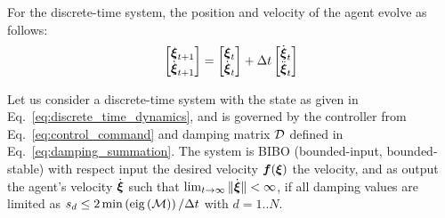 For the discrete-time system, the position and velocity of the agent evolve as follows:
\begin{equation}
	\begin{bmatrix}
	 \vecs \xi_{t+1} \\ \dot{\vecs \xi}_{t+1}
	\end{bmatrix}
	=
	\begin{bmatrix}
	 \vecs \xi_{t} \\ \dot{\vecs \xi}_{t}
	\end{bmatrix}
	+ 
	\Delta t 
	\begin{bmatrix}
		\dot{\vecs \xi}_{t} \\ \ddot{\vecs \xi}_t 
	\end{bmatrix}
	\label{eq:discrete_time_dynamics}
\end{equation}

\begin{lemma}
	Let us consider a discrete-time system with the state as given in Eq.~\eqref{eq:discrete_time_dynamics}, and is governed by the controller from Eq.~\eqref{eq:control_command} and damping matrix $\mathcal{D}$ defined in Eq.~\eqref{eq:damping_summation}.
	The system is BIBO (bounded-input, bounded-stable) with respect input the desired velocity $\boldsymbol{f}(\boldsymbol{\xi})$ the velocity, and as output the agent's velocity $\dot{\boldsymbol{\xi}}$ such that $\lim_{t \rightarrow \infty} \| \dot{\boldsymbol{\xi}} \| < \infty$, if all damping values are limited as $s_{d} \leq 2 \min \left( \text{eig}\left(\mathcal{M}\right)  \right) / \Delta t$ with $d=1.. N$.
\end{lemma}

